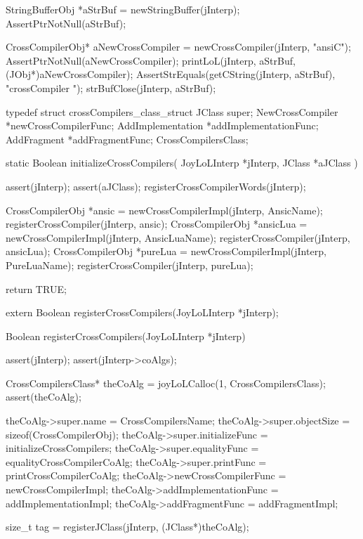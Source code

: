 {{  StringBufferObj *aStrBuf = newStringBuffer(jInterp);
  AssertPtrNotNull(aStrBuf);
  
  CrossCompilerObj* aNewCrossCompiler =
    newCrossCompiler(jInterp, "ansiC");
  AssertPtrNotNull(aNewCrossCompiler);
  printLoL(jInterp, aStrBuf, (JObj*)aNewCrossCompiler);
  AssertStrEquals(getCString(jInterp, aStrBuf), "crossCompiler ");
  strBufClose(jInterp, aStrBuf);
\stopCTest
\stopTestCase
\stopTestSuite

\startTestSuite[registerCrossCompilers]

\startCHeader
typedef struct crossCompilers_class_struct {
  JClass            super;
  NewCrossCompiler  *newCrossCompilerFunc;
  AddImplementation *addImplementationFunc;
  AddFragment       *addFragmentFunc;
} CrossCompilersClass;

\stopCHeader

\startCCode
static Boolean initializeCrossCompilers(
  JoyLoLInterp *jInterp,
  JClass   *aJClass
) {
  assert(jInterp);
  assert(aJClass);
  registerCrossCompilerWords(jInterp);

  CrossCompilerObj *ansic =
    newCrossCompilerImpl(jInterp, AnsicName);
  registerCrossCompiler(jInterp, ansic);
  CrossCompilerObj *ansicLua =
    newCrossCompilerImpl(jInterp, AnsicLuaName);
  registerCrossCompiler(jInterp, ansicLua);
  CrossCompilerObj *pureLua =
    newCrossCompilerImpl(jInterp, PureLuaName);
  registerCrossCompiler(jInterp, pureLua);

  return TRUE;
}
\stopCCode

\startCHeader
extern Boolean registerCrossCompilers(JoyLoLInterp *jInterp);
\stopCHeader
{}

\startCCode
Boolean registerCrossCompilers(JoyLoLInterp *jInterp) {
  assert(jInterp);
  assert(jInterp->coAlgs);
  
  CrossCompilersClass* theCoAlg
    = joyLoLCalloc(1, CrossCompilersClass);
  assert(theCoAlg);
  
  theCoAlg->super.name            = CrossCompilersName;
  theCoAlg->super.objectSize      = sizeof(CrossCompilerObj);
  theCoAlg->super.initializeFunc  = initializeCrossCompilers;
  theCoAlg->super.equalityFunc    = equalityCrossCompilerCoAlg;
  theCoAlg->super.printFunc       = printCrossCompilerCoAlg;
  theCoAlg->newCrossCompilerFunc  = newCrossCompilerImpl;
  theCoAlg->addImplementationFunc = addImplementationImpl;
  theCoAlg->addFragmentFunc       = addFragmentImpl;

  size_t tag =
    registerJClass(jInterp, (JClass*)theCoAlg);
  
}}}
